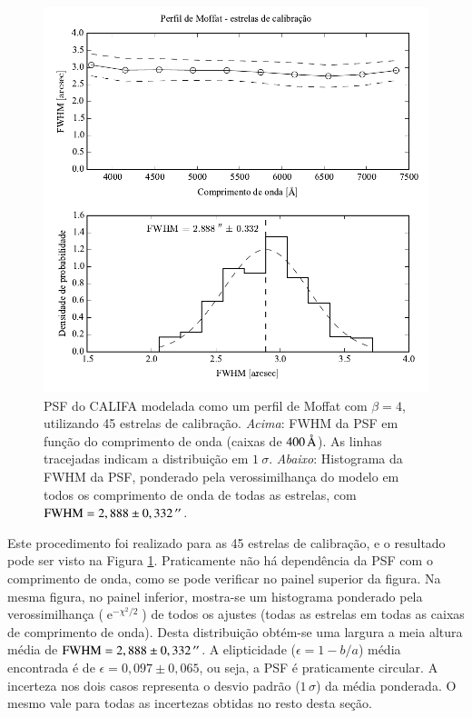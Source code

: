 \begin{figure}
	\includegraphics{figuras/PSFMoffatBeta4_calib}
	\caption[PSF do CALIFA -- estrelas de calibração.]
	{PSF do CALIFA modelada como um perfil de Moffat com $\beta=4$, utilizando 45
	estrelas de calibração. {\em Acima}: FWHM da PSF em função do comprimento de
	onda (caixas de $400\,\text{\normalfont\AA}$). As linhas tracejadas indicam a distribuição
	em $1\ \sigma$. {\em Abaixo}: Histograma da FWHM da PSF, ponderado pela
	verossimilhança do modelo em todos os comprimento de onda de todas as estrelas,
	com $\mathrm{FWHM}=2,888 \pm 0,332\,^{\prime\prime}$.}
	\label{fig:PSFCalib}
\end{figure}

Este procedimento foi realizado para as 45 estrelas de calibração, e o resultado
pode ser visto na Figura \ref{fig:PSFCalib}. Praticamente não há dependência da
PSF com o comprimento de onda, como se pode verificar no painel superior da
figura. Na mesma figura, no painel inferior, mostra-se um histograma ponderado
pela verossimilhança ($\operatorname{e}^{-\chi^2/2}$) de todos os ajustes (todas
as estrelas em todas as caixas de comprimento de onda). Desta distribuição
obtém-se uma largura a meia altura média de $\mathrm{FWHM} = 2,888 \pm
0,332\,^{\prime\prime}$. A elipticidade ($\epsilon = 1 - b/a$) média encontrada é de
$\epsilon = 0,097 \pm 0,065$, ou seja, a PSF é praticamente circular. A
incerteza nos dois casos representa o desvio padrão ($1\,\sigma$) da média
ponderada. O mesmo vale para todas as incertezas obtidas no resto desta seção.

